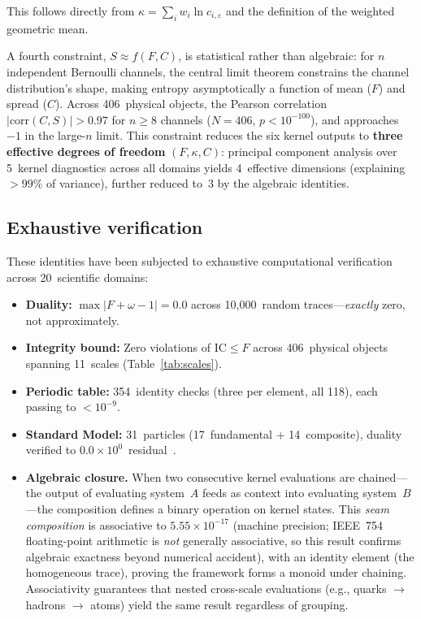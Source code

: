\documentclass[
  aps,
  prx,
  twocolumn,
  superscriptaddress,
  nofootinbib,
  floatfix
]{revtex4-2}
\newcommand{\eps}{\varepsilon}
\newcommand{\IC}{\mathrm{IC}}
\begin{document}
This follows directly from $\kappa = \sum_i w_i \ln c_{i,\eps}$ and
the definition of the weighted geometric mean.

A fourth constraint, $S \approx f(F, C)$, is statistical rather than
algebraic: for $n$ independent Bernoulli channels, the central limit
theorem constrains the channel distribution's shape, making entropy
asymptotically a function of mean ($F$) and spread ($C$).
Across 406~physical objects,
the Pearson correlation
$|\mathrm{corr}(C, S)| > 0.97$ for $n \geq 8$ channels
($N = 406$, $p < 10^{-100}$), and approaches~$-1$ in the
large-$n$ limit. This
constraint reduces the six kernel outputs to \textbf{three effective
degrees of freedom} $(F, \kappa, C)$: principal component analysis
over 5~kernel diagnostics across all domains yields 4~effective
dimensions (explaining $> 99\%$ of variance), further reduced to~3
by the algebraic identities.

\subsection{Exhaustive verification}

These identities have been subjected to exhaustive computational
verification across 20~scientific domains:

\begin{itemize}[leftmargin=1.5em,itemsep=2pt]
\item \textbf{Duality:} $\max|F + \omega - 1| = 0.0$
  across 10{,}000~random traces---\emph{exactly} zero, not
  approximately.
\item \textbf{Integrity bound:} Zero violations of $\IC \leq F$
  across 406~physical objects spanning 11~scales
  (Table~\ref{tab:scales}).
\item \textbf{Periodic table:} 354~identity checks (three per
  element, all 118), each passing to $< 10^{-9}$.
\item \textbf{Standard Model:} 31~particles (17~fundamental +
  14~composite), duality verified to
  $0.0 \times 10^{0}$~residual~\cite{pdg2024}.
\item \textbf{Algebraic closure.} When two consecutive kernel
  evaluations are chained---the output of evaluating system~$A$
  feeds as context into evaluating system~$B$---the composition
  defines a binary operation on kernel states. This \emph{seam
  composition} is associative to
  $5.55 \times 10^{-17}$ (machine precision; IEEE~754
  floating-point arithmetic is \emph{not} generally associative,
  so this result confirms algebraic exactness beyond numerical
  accident), with an identity
  element (the homogeneous trace), proving the framework forms a
  monoid under chaining. Associativity guarantees that nested
  cross-scale evaluations (e.g., quarks $\to$ hadrons $\to$ atoms)
  yield the same result regardless of grouping.
\end{itemize}
\end{document}
